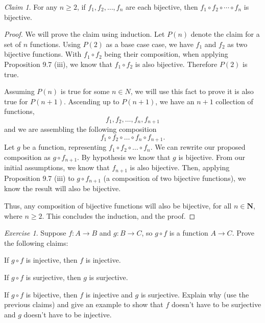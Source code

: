 \documentclass[12pt,oneside]{amsart}
\theoremstyle{remark}
\newtheorem{exer}{Exercise}
\newtheorem{claim}{Claim}[exer]
\newcommand{\bfN}{\mathbf{N}}
\begin{document}
\begin{claim}
For any $n \geq 2$, if $f_1, f_2, \dotsc, f_n$ are each bijective, then $f_1 \circ f_2 \circ \dotsb \circ f_n$ is bijective.
\end{claim}
\begin{proof}
We will prove the claim using induction. Let $P(n)$ denote the claim for a set of $n$ functions. Using $P(2)$ as a base case case, we have $f_1$ and $f_2$ as two bijective functions. With $f_1 \circ f_2$ being their composition, when applying Proposition 9.7 (iii), we know that $f_1 \circ f_2$ is also bijective. Therefore $P(2)$ is true.

Assuming $P(n)$ is true for some $n \in N$, we will use this fact to prove it is also true for $P(n + 1)$. Ascending up to $P(n + 1)$, we have an $n + 1$ collection of functions, \[ f_1, f_2, \dotsc, f_n, f_{n + 1} \] and we are assembling the following composition \[ f_1 \circ f_2 \circ \dotsc \circ f_n \circ f_{n + 1}. \] Let $g$ be a function, representing $f_1 \circ f_2 \circ \dotsc \circ f_n$. We can rewrite our proposed composition as $g \circ f_{n + 1}.$ By hypothesis we know that $g$ is bijective. From our initial assumptions, we know that $f_{n + 1}$ is also bijective. Then, applying Proposition 9.7 (iii) to $g \circ f_{n + 1}$ (a composition of two bijective functions), we know the result will also be bijective.

Thus, any composition of bijective functions will also be bijective, for all $n \in \bfN$, where $n \geq 2$. This concludes the induction, and the proof.
\end{proof}

\newpage
\begin{exer}
Suppose $f: A \to B$ and $g: B \to C$, so $g \circ f$ is a function $A \to C$. Prove the following claims:

If $g \circ f$ is injective, then $f$ is injective.

If $g \circ f$ is surjective, then $g$ is surjective.


If $g \circ f$ is bijective, then $f$ is injective and $g$ is surjective. Explain why (use the previous claims) and give an example to show that $f$ doesn’t have to be surjective and $g$ doesn’t have to be injective.

\end{exer}
\end{document}
